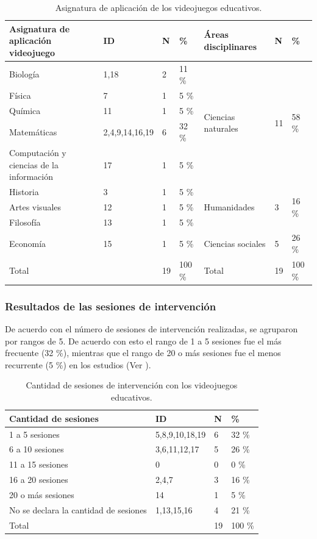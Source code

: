 \documentclass[spanish]{textolivre}
\begin{document}
\begin{table}[htbp]
\caption{Asignatura de aplicación de los videojuegos educativos.}
\label{tbl8}
\centering
\begin{tabular}{ p{3.5cm} l l l l l l}
\toprule 
\textbf{Asignatura de aplicación videojuego} & \textbf{ID} & \textbf{N} & \textbf{\%} & \textbf{Áreas disciplinares} & \textbf{N} & \textbf{\%}
\\
\midrule
Biología & 1,18 & 2 & 11 \% & \multirow{5}{*}{Ciencias naturales} & \multirow{5}{*}{11} & \multirow{5}{*}{58 \%}
\\
Física & 7 & 1 & 5 \% & & &
\\
Química & 11 & 1 & 5 \% & & &
\\
Matemáticas & 2,4,9,14,16,19 & 6 & 32 \% & & &
\\
Computación y ciencias de la información & 17 & 1 & 5 \% & & &
\\
Historia & 3 & 1 & 5 \% & \multirow{3}{*}{Humanidades} & \multirow{3}{*}{3} & \multirow{3}{*}{16 \%}
\\
Artes visuales & 12 & 1 & 5 \% & & &
\\
Filosofía & 13 & 1 & 5 \% & & &
\\
Economía & 15 & 1 & 5 \% & Ciencias sociales & 5 & 26 \%
\\
Total & & 19 & 100 \% & Total & 19 & 100 \%
\\
\bottomrule
\end{tabular}
\end{table}

\subsubsection{Resultados de las sesiones de intervención}\label{sec-idioma}
De acuerdo con el número de sesiones de intervención realizadas, se agruparon por rangos de 5. De acuerdo con esto el rango de 1 a 5 sesiones fue el más frecuente (32 \%), mientras que el rango de 20 o más sesiones fue el menos recurrente (5 \%) en los estudios (Ver ).

\begin{table}[htbp]
\caption{Cantidad de sesiones de intervención con los videojuegos educativos.}
\label{tbl9}
\centering
\begin{tabular}{p{4cm} l l l}
\toprule 
\textbf{Cantidad de sesiones} & \textbf{ID} & \textbf{N} & \textbf{\%}
\\
\midrule
1 a 5 sesiones & 5,8,9,10,18,19 & 6 & 32 \%
\\
6 a 10 sesiones & 3,6,11,12,17 & 5 & 26 \%
\\
11 a 15 sesiones & 0 & 0 & 0 \%
\\
16 a 20 sesiones & 2,4,7 & 3 & 16 \%
\\
20 o más sesiones & 14 & 1 & 5 \%
\\
No se declara la cantidad de sesiones & 1,13,15,16 & 4 & 21 \%
\\
Total & & 19 & 100 \%
\\
\bottomrule
\end{tabular}
\end{table}
\end{document}
